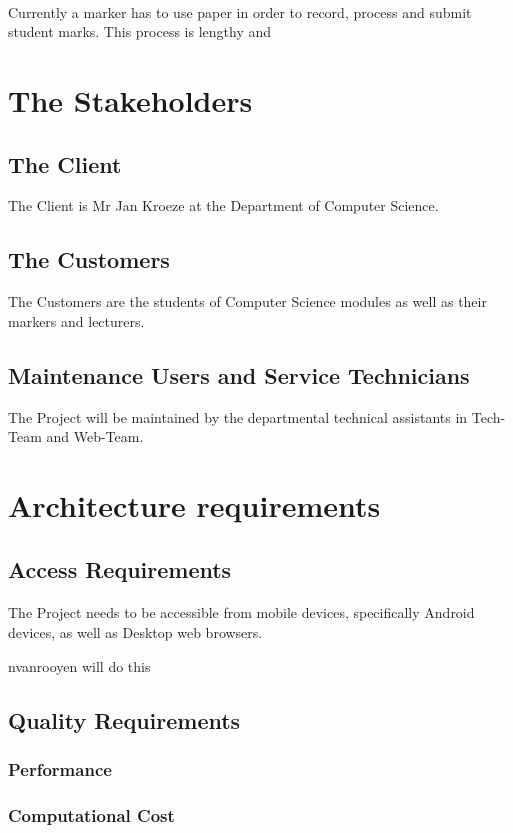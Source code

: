 \documentclass[12pt,a4paper]{article}
\begin{document}
\paragraph{}
Currently a marker has to use paper in order to record, process and submit student marks. This process is lengthy and 
\section{The Stakeholders}
\subsection{The Client}
The Client is Mr Jan Kroeze at the Department of Computer Science.
\subsection{The Customers}
The Customers are the students of Computer Science modules as well as their markers and lecturers.
\subsection{Maintenance Users and Service Technicians}
The Project will be maintained by the departmental technical assistants in Tech-Team and Web-Team.
\section{Architecture requirements}
\subsection{Access Requirements}
\paragraph{}
The Project needs to be accessible from mobile devices, specifically Android devices, as well as Desktop web browsers.\\
\begin{Huge} nvanrooyen will do this \end{Huge}
\subsection{Quality Requirements}
\subsubsection{Performance}
\subsubsection{Computational Cost}
\end{document}
